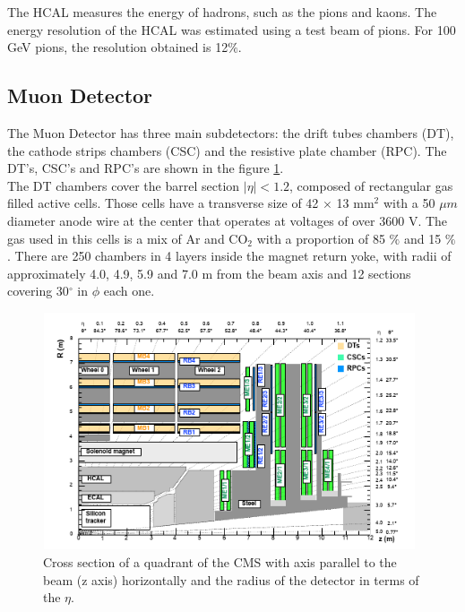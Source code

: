 The HCAL measures the energy of hadrons, such as the pions and kaons. 
The energy resolution of the HCAL was estimated using a test beam of pions. For 100 GeV pions, the resolution obtained is 12$\%$.

\subsection{Muon Detector}
The Muon Detector has three main subdetectors: the drift tubes chambers (DT), the cathode strips chambers (CSC) and the resistive plate chamber (RPC). 
The DT's, CSC's and RPC's are shown in the figure \ref{dt}.
 \\
 
The DT chambers cover the barrel section $|\eta|<1.2$, composed of rectangular gas filled active cells. Those cells have a transverse size of 42 $\times$ 13 mm$^2$ with a 50 $\mu m$ diameter anode wire at the center that operates at voltages of over 3600 V. The gas used in this cells is a mix of Ar and CO$_2$ with a proportion of 85 $\%$ and 15 $\%$. There are 250 chambers in 4 layers inside the magnet return yoke, with radii of approximately 4.0, 4.9, 5.9 and 7.0 m from the beam axis and 12 sections covering 30$^\circ$ in $\phi$ each one.
\\
\begin{figure}[!htbp]
	\centering
	\includegraphics[width=11cm,height=7cm]{Chapter2/csc}
	\caption[Cross section of a quadrant of the CMS with axis parallel to the beam (z axis) horizontally and the radius of the detector in terms of the $\eta$]{Cross section of a quadrant of the CMS with axis parallel to the beam (z axis) horizontally and the radius of the detector in terms of the $\eta$\cite{cms-manual}.}
	\label{dt}
\end{figure}

